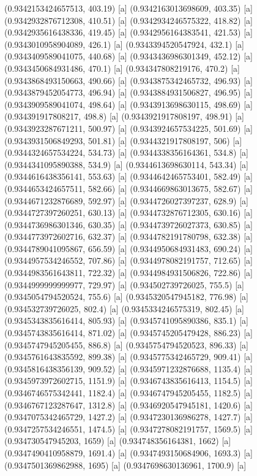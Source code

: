 {{{(0.9342153424657513, 403.19) [a] 
(0.9342163013698609, 403.35) [a] 
(0.9342932876712308, 410.51) [a] 
(0.9342934246575322, 418.82) [a] 
(0.9342935616438336, 419.45) [a] 
(0.9342956164383541, 421.53) [a] 
(0.9343010958904089, 426.1) [a] 
(0.9343394520547924, 432.1) [a] 
(0.9343409589041075, 440.68) [a] 
(0.9343436986301349, 452.12) [a] 
(0.9343450684931486, 470.1) [a] 
(0.934347808219176, 470.2) [a] 
(0.9343868493150663, 490.66) [a] 
(0.9343875342465732, 496.93) [a] 
(0.9343879452054773, 496.94) [a] 
(0.9343884931506827, 496.95) [a] 
(0.9343909589041074, 498.64) [a] 
(0.9343913698630115, 498.69) [a] 
(0.934391917808217, 498.8) [a] 
(0.9343921917808197, 498.91) [a] 
(0.9343923287671211, 500.97) [a] 
(0.9343924657534225, 501.69) [a] 
(0.9343931506849293, 501.81) [a] 
(0.9344321917808197, 506) [a] 
(0.9344324657534224, 534.73) [a] 
(0.9344338356164361, 534.8) [a] 
(0.9344341095890388, 534.9) [a] 
(0.9344613698630114, 543.34) [a] 
(0.9344616438356141, 553.63) [a] 
(0.9344642465753401, 582.49) [a] 
(0.9344653424657511, 582.66) [a] 
(0.9344669863013675, 582.67) [a] 
(0.9344671232876689, 592.97) [a] 
(0.9344726027397237, 628.9) [a] 
(0.9344727397260251, 630.13) [a] 
(0.9344732876712305, 630.16) [a] 
(0.9344736986301346, 630.35) [a] 
(0.9344739726027373, 630.85) [a] 
(0.9344773972602716, 632.37) [a] 
(0.9344782191780798, 632.38) [a] 
(0.9344789041095867, 656.59) [a] 
(0.9344950684931483, 690.24) [a] 
(0.9344957534246552, 707.86) [a] 
(0.9344978082191757, 712.65) [a] 
(0.9344983561643811, 722.32) [a] 
(0.9344984931506826, 722.86) [a] 
(0.9344999999999977, 729.97) [a] 
(0.934502739726025, 755.5) [a] 
(0.9345054794520524, 755.6) [a] 
(0.9345320547945182, 776.98) [a] 
(0.934532739726025, 802.4) [a] 
(0.9345334246575319, 802.45) [a] 
(0.9345343835616414, 805.93) [a] 
(0.9345741095890386, 835.1) [a] 
(0.9345743835616414, 871.02) [a] 
(0.9345745205479428, 886.23) [a] 
(0.9345747945205455, 886.8) [a] 
(0.9345754794520523, 896.33) [a] 
(0.9345761643835592, 899.38) [a] 
(0.9345775342465729, 909.41) [a] 
(0.9345816438356139, 909.52) [a] 
(0.9345971232876688, 1135.4) [a] 
(0.9345973972602715, 1151.9) [a] 
(0.9346743835616413, 1154.5) [a] 
(0.9346746575342441, 1182.4) [a] 
(0.9346747945205455, 1182.5) [a] 
(0.9346767123287647, 1312.8) [a] 
(0.9346920547945181, 1420.6) [a] 
(0.9347075342465729, 1427.2) [a] 
(0.9347230136986278, 1427.7) [a] 
(0.9347257534246551, 1474.5) [a] 
(0.9347278082191757, 1569.5) [a] 
(0.934730547945203, 1659) [a] 
(0.934748356164381, 1662) [a] 
(0.9347490410958879, 1691.4) [a] 
(0.9347493150684906, 1693.3) [a] 
(0.9347501369862988, 1695) [a] 
(0.9347698630136961, 1700.9) [a] 
}}}
